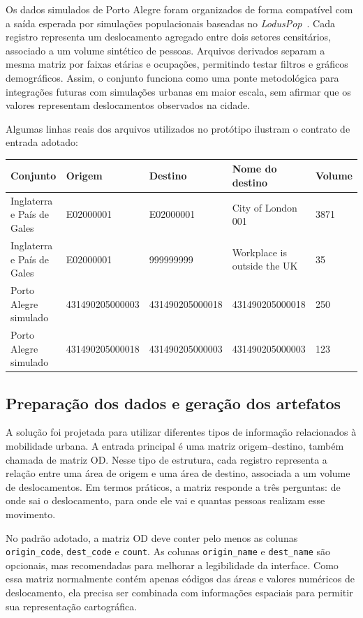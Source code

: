 \documentclass[12pt]{article}
\begin{document}
Os dados simulados de Porto Alegre foram organizados de forma compatível com a saída esperada por simulações populacionais baseadas no \textit{LodusPop}~\cite{Lodus}. Cada registro representa um deslocamento agregado entre dois setores censitários, associado a um volume sintético de pessoas. Arquivos derivados separam a mesma matriz por faixas etárias e ocupações, permitindo testar filtros e gráficos demográficos. Assim, o conjunto funciona como uma ponte metodológica para integrações futuras com simulações urbanas em maior escala, sem afirmar que os valores representam deslocamentos observados na cidade.

Algumas linhas reais dos arquivos utilizados no protótipo ilustram o contrato de entrada adotado:

\begin{center}
\footnotesize
\begin{tabular}{L{2.4cm} L{2.6cm} L{2.4cm} L{2.8cm} L{1.2cm}}
\hline
\textbf{Conjunto} & \textbf{Origem} & \textbf{Destino} & \textbf{Nome do destino} & \textbf{Volume} \\
\hline
Inglaterra e País de Gales & E02000001 & E02000001 & City of London 001 & 3871 \\
Inglaterra e País de Gales & E02000001 & 999999999 & Workplace is outside the UK & 35 \\
Porto Alegre simulado & 431490205000003 & 431490205000018 & 431490205000018 & 250 \\
Porto Alegre simulado & 431490205000018 & 431490205000003 & 431490205000003 & 123 \\
\hline
\end{tabular}
\end{center}

\subsection{Preparação dos dados e geração dos artefatos}
\label{sec:preparacao-dados}

A solução foi projetada para utilizar diferentes tipos de informação relacionados à mobilidade urbana. A entrada principal é uma matriz origem--destino, também chamada de matriz OD. Nesse tipo de estrutura, cada registro representa a relação entre uma área de origem e uma área de destino, associada a um volume de deslocamentos. Em termos práticos, a matriz responde a três perguntas: de onde sai o deslocamento, para onde ele vai e quantas pessoas realizam esse movimento.

No padrão adotado, a matriz OD deve conter pelo menos as colunas \texttt{origin\_code}, \texttt{dest\_code} e \texttt{count}. As colunas \texttt{origin\_name} e \texttt{dest\_name} são opcionais, mas recomendadas para melhorar a legibilidade da interface. Como essa matriz normalmente contém apenas códigos das áreas e valores numéricos de deslocamento, ela precisa ser combinada com informações espaciais para permitir sua representação cartográfica.
\end{document}
